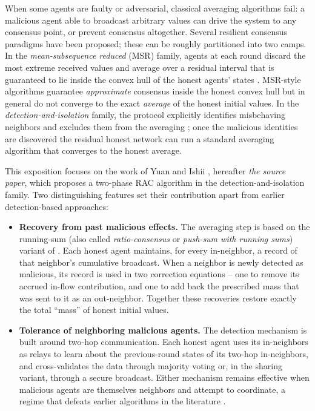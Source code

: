 \documentclass[journal]{IEEEtran}
\begin{document}
When some agents are faulty or adversarial, classical averaging algorithms
fail: a malicious agent able to broadcast arbitrary values can drive the
system to any consensus point, or prevent consensus altogether.  Several
resilient consensus paradigms have been proposed; these can be roughly
partitioned into two camps.  In the \emph{mean-subsequence reduced} (MSR)
family, agents at each round discard the most extreme received values and
average over a residual interval that is guaranteed to lie inside the convex
hull of the honest agents' states \cite{leblanc2013resilient,
dibaji2018randomized}.  MSR-style algorithms guarantee \emph{approximate}
consensus inside the honest convex hull but in general do not converge to the
exact \emph{average} of the honest initial values.  In the
\emph{detection-and-isolation} family, the protocol explicitly identifies
misbehaving neighbors and excludes them from the averaging
\cite{pasqualetti2012consensus,zhao2018resilient}; once the malicious
identities are discovered the residual honest network can run a standard
averaging algorithm that converges to the honest average.

This exposition focuses on the work of Yuan and Ishii
\cite{yuan2024resilient}, hereafter \emph{the source paper}, which proposes a
two-phase RAC algorithm in the detection-and-isolation family.  Two
distinguishing features set their contribution apart from earlier
detection-based approaches:
\begin{itemize}
\item \textbf{Recovery from past malicious effects.}  The averaging step is
based on the running-sum (also called \emph{ratio-consensus} or \emph{push-sum
with running sums}) variant of \cite{hadjicostis2016robust}.  Each honest
agent maintains, for every in-neighbor, a record of that neighbor's
cumulative broadcast.  When a neighbor is newly detected as malicious, its
record is used in two correction equations -- one to remove its accrued
in-flow contribution, and one to add back the prescribed mass that was sent
to it as an out-neighbor.  Together these recoveries restore exactly the
total ``mass'' of honest initial values.
\item \textbf{Tolerance of neighboring malicious agents.}  The detection
mechanism is built around two-hop communication.  Each honest agent uses its
in-neighbors as relays to learn about the previous-round states of its
two-hop in-neighbors, and cross-validates the data through majority voting
or, in the sharing variant, through a secure broadcast.  Either mechanism
remains effective when malicious agents are themselves neighbors and attempt
to coordinate, a regime that defeats earlier algorithms in the literature
\cite{zheng2021accurate,hadjicostis2023trustworthy}.
\end{itemize}
\end{document}
